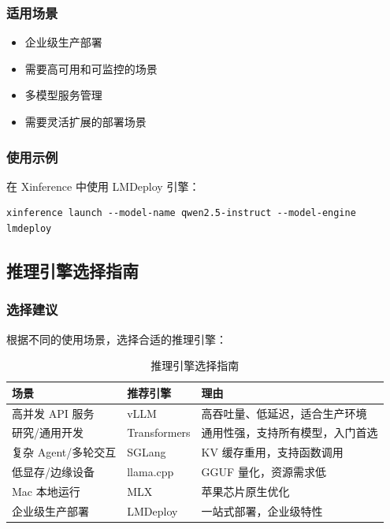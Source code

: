 \documentclass[12pt,UTF8]{ctexbook}
\begin{document}
\subsubsection{适用场景}

\begin{itemize}[leftmargin=2cm]
    \item 企业级生产部署
    \item 需要高可用和可监控的场景
    \item 多模型服务管理
    \item 需要灵活扩展的部署场景
\end{itemize}

\subsubsection{使用示例}

在 Xinference 中使用 LMDeploy 引擎：

\begin{lstlisting}
xinference launch --model-name qwen2.5-instruct --model-engine lmdeploy
\end{lstlisting}

\subsection{推理引擎选择指南}
\label{subsec:inference_selection}

\subsubsection{选择建议}

根据不同的使用场景，选择合适的推理引擎：

\begin{table}[htbp]
    \centering
    \caption{推理引擎选择指南}
    \begin{tabular}{|p{2.5cm}|p{3cm}|p{5cm}|}
        \hline
        \textbf{场景} & \textbf{推荐引擎} & \textbf{理由} \\
        \hline
        高并发 API 服务 & vLLM & 高吞吐量、低延迟，适合生产环境 \\
        \hline
        研究/通用开发 & Transformers & 通用性强，支持所有模型，入门首选 \\
        \hline
        复杂 Agent/多轮交互 & SGLang & KV 缓存重用，支持函数调用 \\
        \hline
        低显存/边缘设备 & llama.cpp & GGUF 量化，资源需求低 \\
        \hline
        Mac 本地运行 & MLX & 苹果芯片原生优化 \\
        \hline
        企业级生产部署 & LMDeploy & 一站式部署，企业级特性 \\
        \hline
    \end{tabular}
\end{table}
\end{document}
